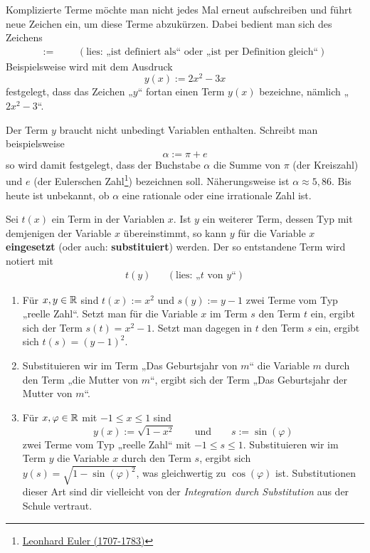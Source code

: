 \begin{nota}[$:=$]
    Komplizierte Terme möchte man nicht jedes Mal erneut aufschreiben und führt neue Zeichen ein, um diese Terme abzukürzen. Dabei bedient man sich des Zeichens
    \begin{align*}
        := &&& (\text{lies: „ist definiert als“ oder „ist per Definition gleich“})
    \end{align*}
    Beispielsweise wird mit dem Ausdruck
        \[ y(x) := 2x^2-3x \]
    festgelegt, dass das Zeichen „$y$“ fortan einen Term $y(x)$ bezeichne, nämlich „$2x^2-3$“.

    Der Term $y$ braucht nicht unbedingt Variablen enthalten. Schreibt man beispielsweise
        \[ \alpha:= \pi + e\]
    so wird damit festgelegt, dass der Buchstabe $\alpha$ die Summe von $\pi$ (der Kreiszahl) und $e$ (der Eulerschen Zahl\footnote{\href{https://de.wikipedia.org/wiki/Leonhard_Euler}{Leonhard Euler (1707-1783)}}) bezeichnen soll. Näherungsweise ist $\alpha \approx 5{,}86$. Bis heute ist unbekannt, ob $\alpha$ eine rationale oder eine irrationale Zahl ist.
\end{nota}


\begin{defin}[* Variablensubstitution] \label{def:substitution}
    Sei $t(x)$ ein Term in der Variablen $x$. Ist $y$ ein weiterer Term, dessen Typ mit demjenigen der Variable $x$ übereinstimmt, so kann $y$ für die Variable $x$ \textbf{eingesetzt} (oder auch: \textbf{substituiert}) werden. Der so entstandene Term wird notiert mit
    \begin{align*}
        t(y) && (\text{lies: „$t$ von $y$“})
    \end{align*}
\end{defin}


\begin{bsp}[*] \quad \label{bsp:substitution}
    \begin{enumerate}
        \item Für $x,y\in\mathbb R$ sind $t(x):=x^2$ und $s(y):=y-1$ zwei Terme vom Typ „reelle Zahl“. Setzt man für die Variable $x$ im Term $s$ den Term $t$ ein, ergibt sich der Term $s(t)=x^2-1$. Setzt man dagegen in $t$ den Term $s$ ein, ergibt sich $t(s)=(y-1)^2$.
        \item Substituieren wir im Term „Das Geburtsjahr von $m$“ die Variable $m$ durch den Term „die Mutter von $m$“, ergibt sich der Term „Das Geburtsjahr der Mutter von $m$“.
        \item Für $x,\varphi\in \mathbb R$ mit $-1\le x\le 1$ sind
            \[ y(x):=\sqrt{1-x^2} \qquad\text{und}\qquad s:=\sin(\varphi) \]
        zwei Terme vom Typ „reelle Zahl“ mit $-1\le s\le 1$. Substituieren wir im Term $y$ die Variable $x$ durch den Term $s$, ergibt sich $y(s)=\sqrt{1-\sin(\varphi)^2}$, was gleichwertig zu $\cos(\varphi)$ ist. Substitutionen dieser Art sind dir vielleicht von der \emph{Integration durch Substitution} aus der Schule vertraut.
    \end{enumerate}
\end{bsp}


